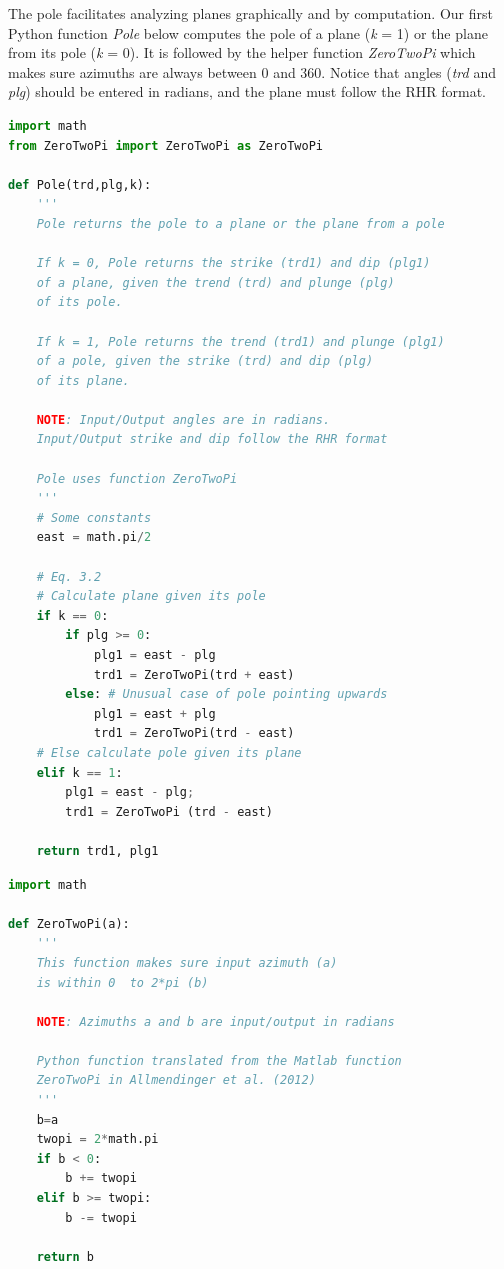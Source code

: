 \documentclass[a4paper , 12pt]{book}
\begin{document}
The pole facilitates analyzing planes graphically and by computation. Our first Python function \textit{Pole} below computes the pole of a plane (\textit{k} = 1) or the plane from its pole (\textit{k} = 0). It is followed by the helper function \textit{ZeroTwoPi} which makes sure azimuths are always between 0 and 360\degree. Notice that angles (\textit{trd} and \textit{plg}) should be entered in radians, and the plane must follow the RHR format.

\begin{center}
\begin{lstlisting}[language=Python, frame=single]
import math
from ZeroTwoPi import ZeroTwoPi as ZeroTwoPi

def Pole(trd,plg,k):
    '''
    Pole returns the pole to a plane or the plane from a pole  

    If k = 0, Pole returns the strike (trd1) and dip (plg1)
    of a plane, given the trend (trd) and plunge (plg) 
    of its pole.

    If k = 1, Pole returns the trend (trd1) and plunge (plg1) 
    of a pole, given the strike (trd) and dip (plg) 
    of its plane.

    NOTE: Input/Output angles are in radians. 
    Input/Output strike and dip follow the RHR format

    Pole uses function ZeroTwoPi
    '''
    # Some constants
    east = math.pi/2

    # Eq. 3.2
    # Calculate plane given its pole
    if k == 0:
        if plg >= 0:
            plg1 = east - plg
            trd1 = ZeroTwoPi(trd + east)
        else: # Unusual case of pole pointing upwards
            plg1 = east + plg
            trd1 = ZeroTwoPi(trd - east) 
    # Else calculate pole given its plane
    elif k == 1:
    	plg1 = east - plg;
    	trd1 = ZeroTwoPi (trd - east)
        
    return trd1, plg1
\end{lstlisting}
\end{center}

\begin{center}
\begin{lstlisting}[language=Python, frame=single]
import math

def ZeroTwoPi(a):
    '''
    This function makes sure input azimuth (a)
    is within 0  to 2*pi (b)
    
    NOTE: Azimuths a and b are input/output in radians
    
    Python function translated from the Matlab function 
    ZeroTwoPi in Allmendinger et al. (2012)
    '''
    b=a
    twopi = 2*math.pi
    if b < 0:
        b += twopi
    elif b >= twopi:
        b -= twopi
        
    return b
\end{lstlisting}    
\end{center}
\end{document}
